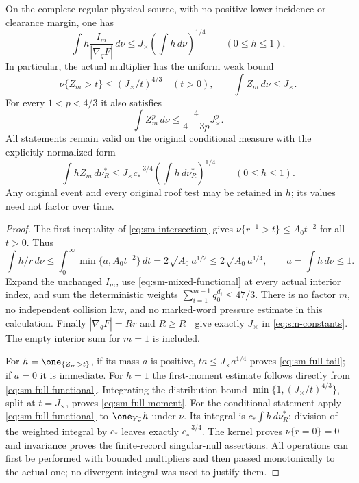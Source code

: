 \begin{theorem}
\label{thm:sm-full-multiplier}
On the complete regular physical source, with no positive lower
incidence or clearance margin, one has
\begin{equation}\label{eq:sm-full-functional}
 \int h\frac{I_m}{|\nabla_qF|}\,d\nu
       \le J_\times\left(\int h\,d\nu\right)^{1/4}
       \qquad(0\le h\le1).
\end{equation}
In particular, the actual multiplier has the uniform weak bound
\begin{equation}\label{eq:sm-full-tail}
 \nu\{Z_m>t\}\le(J_\times/t)^{4/3}\quad(t>0),
 \qquad \int Z_m\,d\nu\le J_\times.
\end{equation}
For every $1<p<4/3$ it also satisfies
\begin{equation}\label{eq:sm-full-moment}
 \int Z_m^p\,d\nu
                     \le\frac{4}{4-3p}J_\times^p.
\end{equation}
All statements remain valid on the original conditional measure
with the explicitly normalized form
\begin{equation}\label{eq:sm-conditioned-functional}
 \int hZ_m\,d\nu_R^*
       \le J_\times c_*^{-3/4}
                    \left(\int h\,d\nu_R^*\right)^{1/4}
                    \qquad(0\le h\le1).
\end{equation}
Any original event and every original roof test may be retained in
$h$; its values need not factor over time.
\end{theorem}
\begin{proof}
The first inequality of \eqref{eq:sm-intersection} gives
$\nu\{r^{-1}>t\}\le A_0t^{-2}$ for all $t>0$.  Thus
\[
 \int h/r\,d\nu
       \le\int_0^\infty\min\{a,A_0t^{-2}\}\,dt
       =2\sqrt{A_0}\,a^{1/2}
       \le2\sqrt{A_0}\,a^{1/4},
 \qquad a=\int h\,d\nu\le1.
\]
Expand the unchanged $I_m$, use
\eqref{eq:sm-mixed-functional} at every actual interior index,
and sum the deterministic weights
$\sum_{i=1}^{m-1}q_0^{d_i}\le47/3$.
There is no factor $m$, no independent collision law, and no
marked-word pressure estimate in this calculation.  Finally
$|\nabla_qF|=Rr$ and $R\ge R_-$ give exactly
$J_\times$ in \eqref{eq:sm-constants}.  The empty interior sum
for $m=1$ is included.

For $h=\one_{\{Z_m>t\}}$, if its mass $a$ is positive,
$ta\le J_\times a^{1/4}$ proves \eqref{eq:sm-full-tail};
if $a=0$ it is immediate.  For $h=1$ the first-moment estimate
follows directly from \eqref{eq:sm-full-functional}.
Integrating the distribution bound
$\min\{1,(J_\times/t)^{4/3}\}$, split at $t=J_\times$,
proves \eqref{eq:sm-full-moment}.
For the conditional statement apply \eqref{eq:sm-full-functional}
to $\one_{Y_R^*}h$ under $\nu$.  Its integral is
$c_*\int h\,d\nu_R^*$; division of the weighted integral by
$c_*$ leaves exactly $c_*^{-3/4}$.
The kernel proves $\nu\{r=0\}=0$ and invariance proves the
finite-record singular-null assertions.  All operations can first
be performed with bounded multipliers and then passed monotonically
to the actual one; no divergent integral was used to justify them.
\end{proof}


